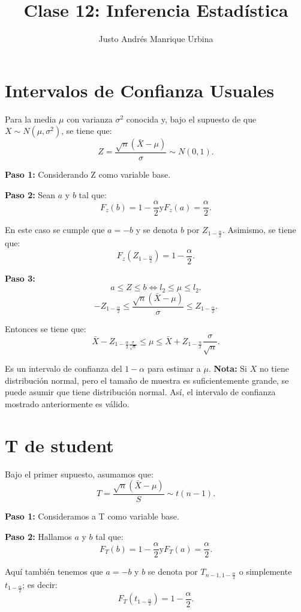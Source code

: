 \documentclass{article}
\title{Clase 12: Inferencia Estadística}
\author{Justo Andrés Manrique Urbina}
\begin{document}
\maketitle
\section{Intervalos de Confianza Usuales}
Para la media $\mu$ con varianza $\sigma^{2}$ conocida y, bajo el supuesto de que $X \sim N{(\mu,\sigma^{2})}$, se tiene que:
\[ Z=\frac{\sqrt{n}{(\bar{X}-\mu)}}{\sigma} \sim N{(0,1)}.\]

\textbf{Paso 1:} Considerando Z como variable base.

\textbf{Paso 2:} Sean $a$ y $b$ tal que:
\[ F_{z}{(b)}=1-\frac{\alpha}{2} \text{y} F_{z}{(a)}=\frac{\alpha}{2}.\]

En este caso se cumple que $a = -b$ y se denota $b$ por $Z_{1-\frac{\alpha}{2}}$. Asimismo, se tiene que:
\[ F_{z}{(Z_{1-\frac{\alpha}{2}})}=1-\frac{\alpha}{2}.\]

\textbf{Paso 3:}
\[ a \leq Z \leq b \iff l_{2} \leq \mu \leq l_{2}.\]
\[ -Z_{1-\frac{\alpha}{2}} \leq \frac{\sqrt{n}{(\bar{X}-\mu)}}{\sigma} \leq Z_{1-\frac{\alpha}{2}}.\]

Entonces se tiene que:
\[ \bar{X} - Z_{1-\frac{\alpha}{2}\frac{\sigma}{\sqrt{n}}} \leq \mu \leq \bar{X}+Z_{1-\frac{\alpha}{2}}\frac{\sigma}{\sqrt{n}}.\]

Es un intervalo de confianza del $1-\alpha$ para estimar a $\mu$. \textbf{Nota:} Si $X$ no tiene distribución normal, pero el tamaño de muestra es suficientemente grande, se puede asumir que tiene distribución normal. Así, el intervalo de confianza mostrado anteriormente es válido.

\section{T de student}

Bajo el primer supuesto, asumamos que:
\[ T = \frac{\sqrt{n}{(\bar{X}-\mu)}}{S}\sim t{(n-1)}.\]

\textbf{Paso 1:} Consideramos a T como variable base.

\textbf{Paso 2:} Hallamos $a$ y $b$ tal que:
\[ F_{T}{(b)}=1-\frac{\alpha}{2} \text{y} F_{T}{(a)}=\frac{\alpha}{2}.\]

Aquí también tenemos que $a=-b$ y $b$ se denota por $T_{n-1,1-\frac{\alpha}{2}}$ o simplemente $t_{1-\frac{\alpha}{2}}$; es decir:
\[ F_{T}{(t_{1-\frac{\alpha}{2}})}=1-\frac{\alpha}{2}.\]
\end{document}
